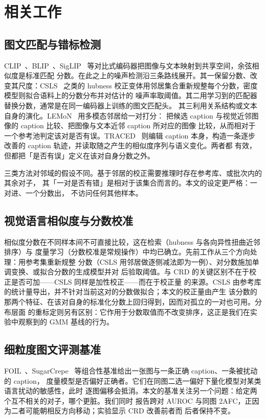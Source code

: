 \documentclass[10pt,twocolumn,a4paper]{ctexart}
\begin{document}
\section{相关工作}

\subsection{图文匹配与错标检测}
CLIP~\cite{clip}、BLIP~\cite{blip}、SigLIP~\cite{siglip} 等对比式编码器把图像与文本映射到共享空间，余弦相似度是标准匹配
分数。在此之上的噪声检测沿三条路线展开。其一保留分数、改变其尺度：CSLS~\cite{csls} 之类的
hubness 校正变体用邻居集合重新规整每个分数，密度模型则拟合语料上的分数分布并对估计的
噪声率取阈值。其二用学习到的匹配器替换分数，通常是在同一编码器上训练的图文匹配头。
其三利用关系结构或文本自身的演化。LEMoN~\cite{lemon} 用多模态邻居给一对打分：
把候选 caption 与视觉近邻图像的 caption 比较、把图像与文本近邻 caption 所对应的图像
比较，从而相对于一个参考池判定该对是否有误。TRACED~\cite{traced} 则编辑 caption
本身，构造一条逐步改善的 caption 轨迹，并读取随之产生的相似度序列与语义变化。两者都
有效，但都把「是否有误」定义在该对自身分数之外。

三类方法对邻域的假设不同。基于邻居的校正需要推理时存在参考库、或批次内的其余对子，
其「一对是否有错」是相对于该集合而言的。本文的设定更严格：一对进、一个分数出，
不访问任何其他样本。

\subsection{视觉语言相似度与分数校准}
相似度分数在不同样本间不可直接比较，这在检索（hubness 与各向异性扭曲近邻排序）与
度量学习（分数校准是常规操作）中均已确立。先前工作从三个方向处理：用参考集重新规整
分数（CSLS 用邻居做逐侧减法即为一例）、对分数施加单调变换、或拟合分数的生成模型并对
后验取阈值。与 CRD 的关键区别不在于校正是否可加——CSLS 同样是加性校正——而在于校正量
的来源。CSLS 由参考库的统计量导出，并不针对当前这对的分数做拟合；本文的校正量由产生
该分数的那两个特征、在该对自身的标准化分数上回归得到，因而对孤立的一对也可用。分布层面
的重标定则另有区别：它作用于分数取值而不改变排序，这正是我们在实验中观察到的 GMM
基线的行为。

\subsection{细粒度图文评测基准}
FOIL~\cite{foil}、SugarCrepe~\cite{sugarcrepe} 等组合性基准给出一张图与一条正确 caption、一条被扰动的 caption，
度量模型是否偏好正确者。它们在同图二选一偏好下量化模型对某类语言扰动的敏感性，此时
逐图偏移会抵消。本文的基准关注另一个问题：给定两个互不相关的对子，哪个更脏。我们同时
报告跨对 AUROC 与同图 2AFC，正因为二者可能朝相反方向移动；实验显示 CRD 改善前者而
后者保持不变。
\end{document}
